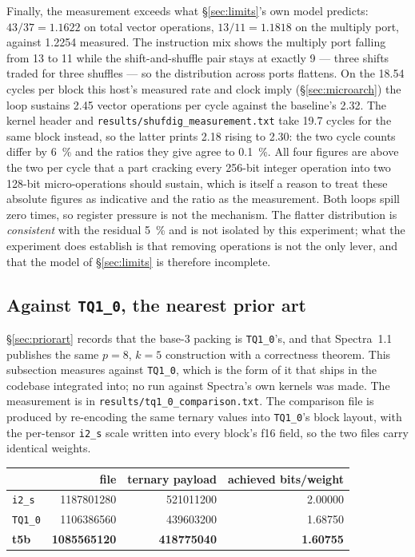 \documentclass[11pt,a4paper]{article}
\newcommand{\code}[1]{\texttt{#1}}
\begin{document}
Finally, the measurement exceeds what \S\ref{sec:limits}'s own model predicts:
$43/37=\num{1.1622}$ on total vector operations, $13/11=\num{1.1818}$ on the
multiply port, against \num{1.2254} measured. The instruction mix shows the
multiply port falling from 13 to 11 while the shift-and-shuffle pair stays at
exactly 9 --- three shifts traded for three shuffles --- so the distribution
across ports flattens. On the \num{18.54} cycles per block this host's measured
rate and clock imply (\S\ref{sec:microarch}) the loop sustains \num{2.45} vector
operations per cycle against the baseline's \num{2.32}. The kernel header and
\code{results/shufdig\_measurement.txt} take \num{19.7} cycles for the same
block instead, so the latter prints \num{2.18} rising to \num{2.30}: the two
cycle counts differ by \SI{6}{\percent} and the ratios they give agree to
\SI{0.1}{\percent}.
All four figures are above the two per cycle that a part cracking
every 256-bit integer operation into two 128-bit micro-operations should
sustain, which is itself a reason to treat these absolute figures as indicative
and the ratio as the measurement. Both loops spill zero times, so register pressure
is not the mechanism. The flatter distribution is \emph{consistent} with the
residual \SI{5}{\percent} and is not isolated by this experiment; what the
experiment does establish is that removing operations is not the only lever, and
that the model of \S\ref{sec:limits} is therefore incomplete.

\subsection{Against \code{TQ1\_0}, the nearest prior art}\label{sec:tq10}

\S\ref{sec:priorart} records that the base-3 packing is \code{TQ1\_0}'s, and
that Spectra~1.1~\cite{spectra} publishes the same $p=8$, $k=5$ construction
with a correctness theorem. This subsection measures against \code{TQ1\_0},
which is the form of it that ships in the codebase integrated into; no run
against Spectra's own kernels was made. The measurement is in \code{results/tq1\_0\_comparison.txt}. The comparison file is produced by re-encoding
the same ternary values into \code{TQ1\_0}'s block layout, with the per-tensor
\code{i2\_s} scale written into every block's f16 field, so the two files carry
identical weights.

\begin{center}
\begin{tabular}{lrrr}
\toprule
 & file & ternary payload & achieved bits/weight \\
\midrule
\code{i2\_s}      & \num{1187801280} & \num{521011200} & \num{2.00000} \\
\code{TQ1\_0}     & \num{1106386560} & \num{439603200} & \num{1.68750} \\
\textbf{t5b}      & \textbf{\num{1085565120}} & \textbf{\num{418775040}} & \textbf{\num{1.60755}} \\
\bottomrule
\end{tabular}
\end{center}
\end{document}
